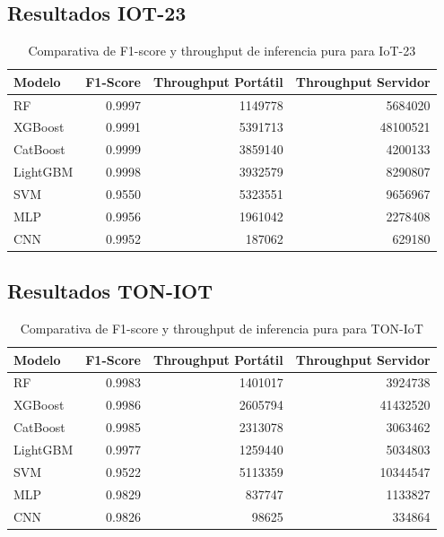 \subsection{Resultados IOT-23}

\begin{table}[H]
\centering
\caption{Comparativa de F1-score y throughput de inferencia pura para IoT-23}
\label{tab:inferencia_iot23}
\begin{tabular}{lrrr}
\toprule
\textbf{Modelo} & \textbf{F1-Score} & \textbf{Throughput Portátil} & \textbf{Throughput Servidor} \\
\midrule
RF       & 0.9997 & 1149778 & 5684020 \\
XGBoost  & 0.9991 & 5391713 & 48100521 \\
CatBoost & 0.9999 & 3859140 & 4200133 \\
LightGBM & 0.9998 & 3932579 & 8290807 \\
SVM      & 0.9550 & 5323551 & 9656967 \\
MLP      & 0.9956 & 1961042 & 2278408 \\
CNN      & 0.9952 & 187062  & 629180 \\
\bottomrule
\end{tabular}%
\end{table}

\subsection{Resultados TON-IOT}

\begin{table}[H] 
\centering
\caption{Comparativa de F1-score y throughput de inferencia pura para TON-IoT}
\label{tab:inferencia_toniot}
\begin{tabular}{lrrr}
\toprule
\textbf{Modelo} & \textbf{F1-Score} & \textbf{Throughput Portátil} & \textbf{Throughput Servidor} \\
\midrule
RF       & 0.9983 & 1401017 & 3924738 \\
XGBoost  & 0.9986 & 2605794 & 41432520 \\
CatBoost & 0.9985 & 2313078 & 3063462\\
LightGBM & 0.9977 & 1259440 & 5034803 \\
SVM      & 0.9522 & 5113359 & 10344547 \\
MLP      & 0.9829 & 837747  & 1133827 \\
CNN      & 0.9826 & 98625  & 334864 \\
\bottomrule
\end{tabular}%
\end{table}

